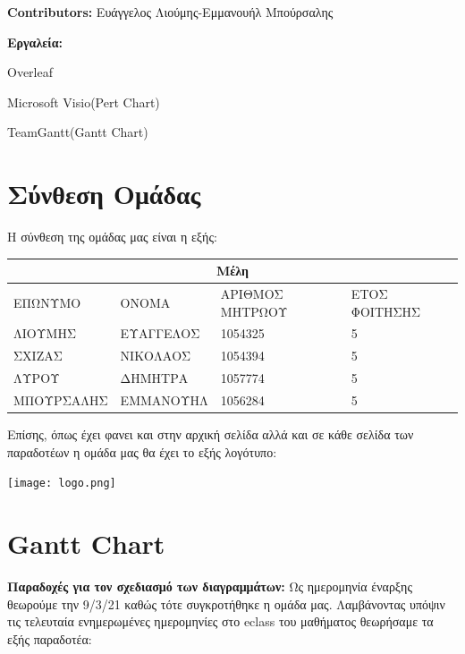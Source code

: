 \documentclass[12pt,a4paper,oneside]{article}
\begin{document}
\textbf{Contributors:}
\newline
Ευάγγελος Λιούμης-Εμμανουήλ Μπούρσαλης


\vspace{8cm}

\raggedright
\textbf{Εργαλεία:}

    Overleaf
    
    Microsoft Visio(Pert Chart)
    
    TeamGantt(Gantt Chart)

\newpage


\tableofcontents
{}

\newpage
\setcounter{page}{1}


\section{Σύνθεση Ομάδας}\label{sec:intro}
\pagestyle{fancy}

Η σύνθεση της ομάδας μας είναι η εξής:
\vspace{0.5cm}

\begin{tabular}{ |p{4cm}|p{4cm}|p{3cm}|p{3cm}|  }
 \hline
 \multicolumn{4}{|c|}{Μέλη} \\
 \hline
 ΕΠΩΝΥΜΟ& ΟΝΟΜΑ &ΑΡΙΘΜΟΣ ΜΗΤΡΩΟΥ&ΕΤΟΣ ΦΟΙΤΗΣΗΣ\\
 \hline
 ΛΙΟΥΜΗΣ   & ΕΥΑΓΓΕΛΟΣ    & 1054325 &  5\\
 ΣΧΙΖΑΣ &  ΝΙΚΟΛΑΟΣ & 1054394  & 5\\
 ΛΥΡΟΥ & ΔΗΜΗΤΡΑ & 1057774 &  5\\
 ΜΠΟΥΡΣΑΛΗΣ   & ΕΜΜΑΝΟΥΗΛ & 1056284 & 5\\
\hline 
\end{tabular}


\vspace{2cm}
Επίσης, όπως έχει φανει και στην αρχική σελίδα αλλά και σε κάθε σελίδα των παραδοτέων η ομάδα μας θα έχει το εξής λογότυπο:
\newline
\vspace{2cm}
\centerline{\texttt{[image: logo.png]}}
 
\newpage

\section{Gantt Chart}\label{sec:lit-rev}
\textbf{Παραδοχές για τον σχεδιασμό των διαγραμμάτων:}
\vspace{2mm}
\newline
 Ως ημερομηνία έναρξης θεωρούμε την 9/3/21 καθώς τότε συγκροτήθηκε η ομάδα μας. Λαμβάνοντας υπόψιν τις τελευταία ενημερωμένες ημερομηνίες στο eclass του μαθήματος θεωρήσαμε τα εξής παραδοτέα:
 \newline
 
\end{document}
